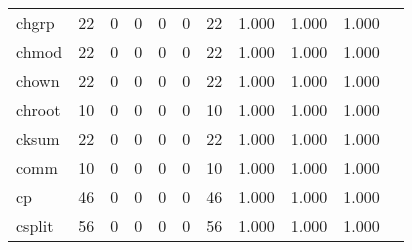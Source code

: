 \begin{longtable}{lp{1.10cm}p{1.10cm}p{1.10cm}p{1.10cm}p{1.10cm}p{1.10cm}p{1.10cm}p{1.10cm}p{1.10cm}p{1.10cm}}
chgrp     &                     22 &                                  0 &                                 0 &                                0 &                                 0 &                              22 &                          1.000 &                                 1.000 &                               1.000 \\
chmod     &                     22 &                                  0 &                                 0 &                                0 &                                 0 &                              22 &                          1.000 &                                 1.000 &                               1.000 \\
chown     &                     22 &                                  0 &                                 0 &                                0 &                                 0 &                              22 &                          1.000 &                                 1.000 &                               1.000 \\
chroot    &                     10 &                                  0 &                                 0 &                                0 &                                 0 &                              10 &                          1.000 &                                 1.000 &                               1.000 \\
cksum     &                     22 &                                  0 &                                 0 &                                0 &                                 0 &                              22 &                          1.000 &                                 1.000 &                               1.000 \\
comm      &                     10 &                                  0 &                                 0 &                                0 &                                 0 &                              10 &                          1.000 &                                 1.000 &                               1.000 \\
cp        &                     46 &                                  0 &                                 0 &                                0 &                                 0 &                              46 &                          1.000 &                                 1.000 &                               1.000 \\
csplit    &                     56 &                                  0 &                                 0 &                                0 &                                 0 &                              56 &                          1.000 &                                 1.000 &                               1.000 \\

\end{longtable}
